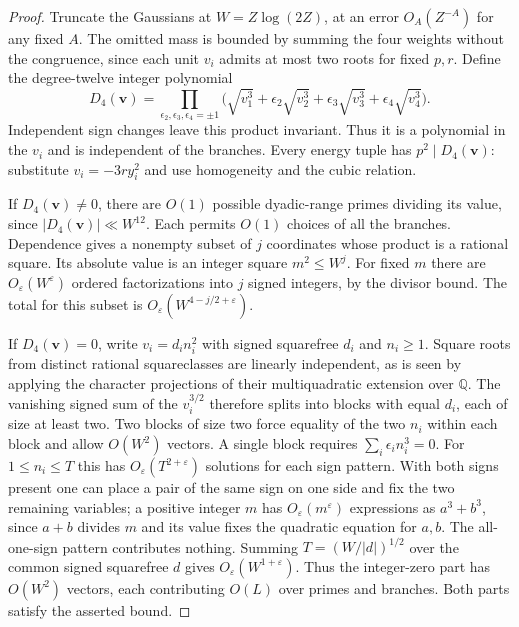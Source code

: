 \documentclass[11pt,letterpaper]{article}
\theoremstyle{definition}
\begin{document}
\begin{proof}
Truncate the Gaussians at $W=Z\log(2Z)$, at an error
$O_A(Z^{-A})$ for any fixed $A$. The omitted mass is bounded
by summing the four weights without the congruence, since each
unit $v_i$ admits at most two roots for fixed $p,r$. Define the
degree-twelve integer polynomial
\[
 D_4(\mathbf v)=\prod_{\epsilon_2,\epsilon_3,\epsilon_4=\pm1}
    \big(\sqrt{v_1^3}+\epsilon_2\sqrt{v_2^3}
              +\epsilon_3\sqrt{v_3^3}+\epsilon_4\sqrt{v_4^3}\big).
\]
Independent sign changes leave this product invariant. Thus it
is a polynomial in the $v_i$ and is independent of the branches.
Every energy tuple has $p^2\mid D_4(\mathbf v)$: substitute
$v_i=-3r y_i^2$ and use homogeneity and the cubic relation.

If $D_4(\mathbf v)\ne0$, there are $O(1)$ possible dyadic-range
primes dividing its value, since $|D_4(\mathbf v)|\ll W^{12}$.
Each permits $O(1)$ choices of all the branches. Dependence gives
a nonempty subset of $j$ coordinates whose product is a rational
square. Its absolute value is an integer square $m^2\le W^j$.
For fixed $m$ there are $O_\varepsilon(W^\varepsilon)$ ordered
factorizations into $j$ signed integers, by the divisor bound.
The total for this subset is
$O_\varepsilon(W^{4-j/2+\varepsilon})$.

If $D_4(\mathbf v)=0$, write $v_i=d_i n_i^2$ with signed
squarefree $d_i$ and $n_i\ge1$. Square roots from distinct rational
squareclasses are linearly independent, as is seen by applying
the character projections of their multiquadratic extension over
$\mathbb Q$. The vanishing signed sum of the $v_i^{3/2}$ therefore
splits into blocks with equal $d_i$, each of size at least two.
Two blocks of size two force equality of the two $n_i$ within each
block and allow $O(W^2)$ vectors. A single block requires
$\sum_i\epsilon_i n_i^3=0$. For $1\le n_i\le T$ this has
$O_\varepsilon(T^{2+\varepsilon})$ solutions for each sign pattern.
With both signs present one can place a pair of the same sign on
one side and fix the two remaining variables; a positive integer
$m$ has $O_\varepsilon(m^\varepsilon)$ expressions as $a^3+b^3$,
since $a+b$ divides $m$ and its value fixes the quadratic equation
for $a,b$. The all-one-sign pattern contributes nothing. Summing
$T=(W/|d|)^{1/2}$ over the common signed squarefree $d$ gives
$O_\varepsilon(W^{1+\varepsilon})$. Thus the integer-zero part has
$O(W^2)$ vectors, each contributing $O(L)$ over primes and branches.
Both parts satisfy the asserted bound.
\end{proof}
\end{document}
